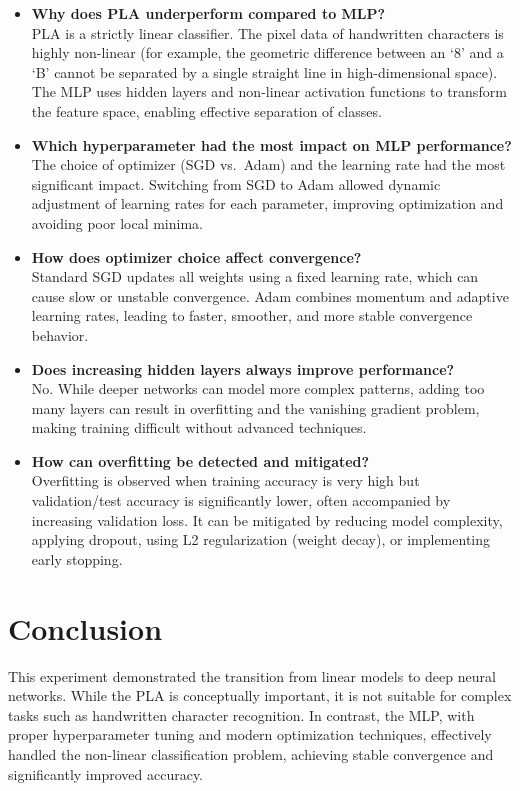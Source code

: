 \documentclass[11pt]{article}
\begin{document}
\begin{itemize}
    \item \textbf{Why does PLA underperform compared to MLP?} \\
    PLA is a strictly linear classifier. The pixel data of handwritten characters is highly non-linear (for example, the geometric difference between an `8' and a `B' cannot be separated by a single straight line in high-dimensional space). The MLP uses hidden layers and non-linear activation functions to transform the feature space, enabling effective separation of classes.
    
    \item \textbf{Which hyperparameter had the most impact on MLP performance?} \\
    The choice of optimizer (SGD vs.\ Adam) and the learning rate had the most significant impact. Switching from SGD to Adam allowed dynamic adjustment of learning rates for each parameter, improving optimization and avoiding poor local minima.
    
    \item \textbf{How does optimizer choice affect convergence?} \\
    Standard SGD updates all weights using a fixed learning rate, which can cause slow or unstable convergence. Adam combines momentum and adaptive learning rates, leading to faster, smoother, and more stable convergence behavior.
    
    \item \textbf{Does increasing hidden layers always improve performance?} \\
    No. While deeper networks can model more complex patterns, adding too many layers can result in overfitting and the vanishing gradient problem, making training difficult without advanced techniques.
    
    \item \textbf{How can overfitting be detected and mitigated?} \\
    Overfitting is observed when training accuracy is very high but validation/test accuracy is significantly lower, often accompanied by increasing validation loss. It can be mitigated by reducing model complexity, applying dropout, using L2 regularization (weight decay), or implementing early stopping.
\end{itemize}

\section*{Conclusion}

This experiment demonstrated the transition from linear models to deep neural networks. While the PLA is conceptually important, it is not suitable for complex tasks such as handwritten character recognition. In contrast, the MLP, with proper hyperparameter tuning and modern optimization techniques, effectively handled the non-linear classification problem, achieving stable convergence and significantly improved accuracy.
\end{document}
